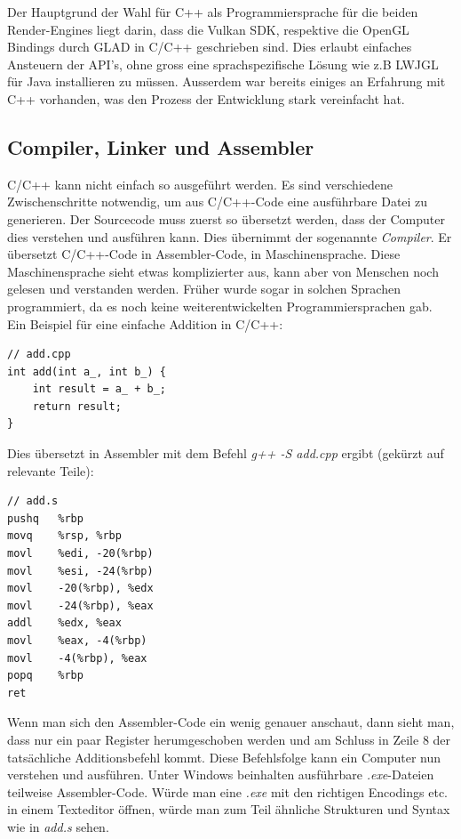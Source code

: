 \documentclass[titlepage, 11pt, a4paper, ngerman]{article}
\begin{document}
Der Hauptgrund der Wahl für C++ als Programmiersprache für die beiden Render-\glspl{Engine} liegt darin, dass die Vulkan SDK, respektive die \acrshort{OpenGL} Bindings durch GLAD in C/C++ geschrieben sind. Dies erlaubt einfaches Ansteuern der \acrshort{API}'s, ohne gross eine sprachspezifische Lösung wie z.B \acrfull{LWJGL} für Java installieren zu müssen. Ausserdem war bereits einiges an Erfahrung mit C++ vorhanden, was den Prozess der Entwicklung stark vereinfacht hat.

\subsection{Compiler, Linker und Assembler}
C/C++ kann nicht einfach so ausgeführt werden. Es sind verschiedene Zwischenschritte notwendig, um aus C/C++-Code eine ausführbare Datei zu generieren. Der Sourcecode muss zuerst so übersetzt werden, dass der Computer dies verstehen und ausführen kann. Dies übernimmt der sogenannte \textit{\gls{Compiler}}. Er übersetzt C/C++-Code in \gls{Assembler}-Code, in Maschinensprache. Diese Maschinensprache sieht etwas komplizierter aus, kann aber von Menschen noch gelesen und verstanden werden. Früher wurde sogar in solchen Sprachen programmiert, da es noch keine weiterentwickelten Programmiersprachen gab. Ein Beispiel für eine einfache Addition in C/C++:
\pagebreak
\begin{verbatim}
// add.cpp
int add(int a_, int b_) {
    int result = a_ + b_;
    return result;
}
\end{verbatim}
\bigbreak
Dies übersetzt in \gls{Assembler} mit dem Befehl \emph{g++ -S add.cpp} ergibt (gekürzt auf relevante Teile):
\begin{verbatim}
// add.s
pushq   %rbp
movq    %rsp, %rbp
movl    %edi, -20(%rbp)
movl    %esi, -24(%rbp)
movl    -20(%rbp), %edx
movl    -24(%rbp), %eax
addl    %edx, %eax
movl    %eax, -4(%rbp)
movl    -4(%rbp), %eax
popq    %rbp
ret
\end{verbatim}
\bigbreak
Wenn man sich den \gls{Assembler}-Code ein wenig genauer anschaut, dann sieht man, dass nur ein paar Register herumgeschoben werden und am Schluss in Zeile 8 der tatsächliche Additionsbefehl kommt. Diese Befehlsfolge kann ein Computer nun verstehen und ausführen. Unter Windows beinhalten ausführbare \textit{.exe}-Dateien teilweise \gls{Assembler}-Code. Würde man eine \textit{.exe} mit den richtigen Encodings etc. in einem \gls{Texteditor} öffnen, würde man zum Teil ähnliche Strukturen und Syntax wie in \textit{add.s} sehen. \par
\end{document}
